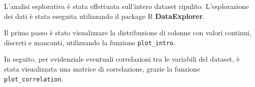 L'analisi esplorativa è stata effettuata sull'intero dataset ripulito. 
L'esplorazione dei dati è stata eseguita utilizzando il package R 
\textbf{DataExplorer}.

Il primo passo è stato visualizzare la distribuzione di colonne con valori 
continui, discreti e mancanti, utilizzando la funzione \texttt{plot\_intro}.

In seguito, per evidenziale eventuali correlazioni tra le variabili del 
dataset, è stata visualizzata una matrice di correlazione, grazie la funzione 
\texttt{plot\_correlation}.
